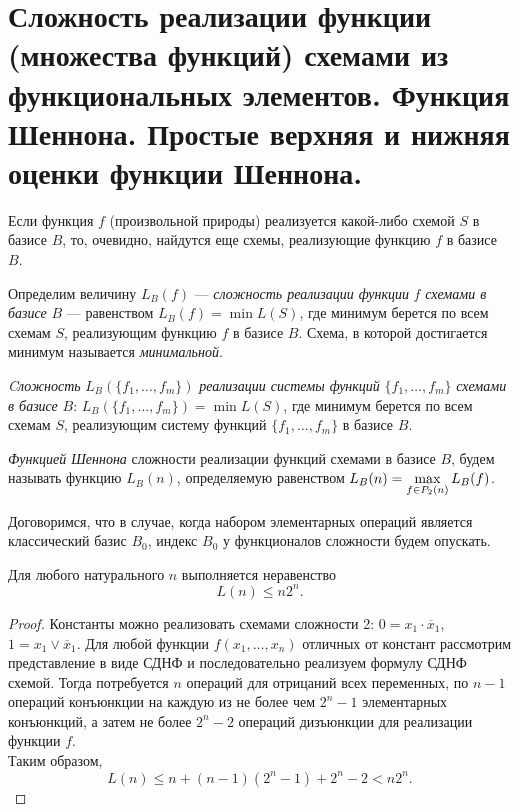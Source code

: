 \section{Сложность реализации функции (множества функций) схемами из функциональных элементов. Функция Шеннона. Простые верхняя и нижняя оценки функции Шеннона.}

Если функция $f$ (произвольной природы) реализуется какой-либо схемой $S$ в базисе $B$, то, очевидно, найдутся еще схемы, реализующие функцию $f$ в базисе $B$. 

\begin{definition}
    Определим величину $L_B(f)$ --- \textit{сложность реализации функции} $f$ \textit{схемами в базисе} $B$ --- равенством $L_B(f) = \min L(S)$, где минимум берется по всем схемам $S$, реализующим функцию $f$ в базисе $B$. Схема, в которой достигается минимум называется \textit{минимальной}.
\end{definition}

\begin{definition}
    \textit{Cложность} $L_B(\{f_1, \ldots, f_m\})$ \textit{реализации системы функций} $\{f_1, \ldots, f_m\}$ \textit{схемами в базисе} $B$: $L_B(\{f_1, \ldots, f_m\}) = \min L(S)$, где минимум берется по всем схемам $S$, реализующим систему функций $\{f_1, \ldots, f_m\}$ в базисе $B$.
\end{definition}

\begin{definition}
    \textit{Функцией Шеннона} сложности реализации функций схемами в базисе $B$, будем называть функцию $L_B(n)$, определяемую равенством $\displaystyle L_B(n) = \max_{f\in P_2(n)} L_B(f)$.
\end{definition}

    Договоримся, что в случае, когда набором элементарных операций является классический базис $B_0$, индекс $B_0$ у функционалов сложности будем опускать.

\begin{theorem}
    Для любого натурального $n$ выполняется неравенство
    \[
        L(n) \leqslant n2^n.
    \]
\end{theorem}

\begin{proof}
    Константы можно реализовать схемами сложности 2: $0 = x_1 \cdot \overline{x}_1$, $1 = x_1 \vee \overline{x}_1$. Для любой функции $f(x_1, \ldots, x_n)$ отличных от констант рассмотрим представление в виде СДНФ и последовательно реализуем формулу СДНФ схемой. Тогда потребуется $n$ операций для отрицаний всех переменных, по $n - 1$ операций конъюнкции на каждую из не более чем $2^{n} - 1$ элементарных конъюнкций, а затем не более $2^{n} - 2$ операций дизъюнкции для реализации функции $f$.\\
    Таким образом, 
    \[
        L(n) \leqslant n + (n-1)(2^{n}-1) + 2^n - 2 < n2^n.
    \]
\end{proof}

